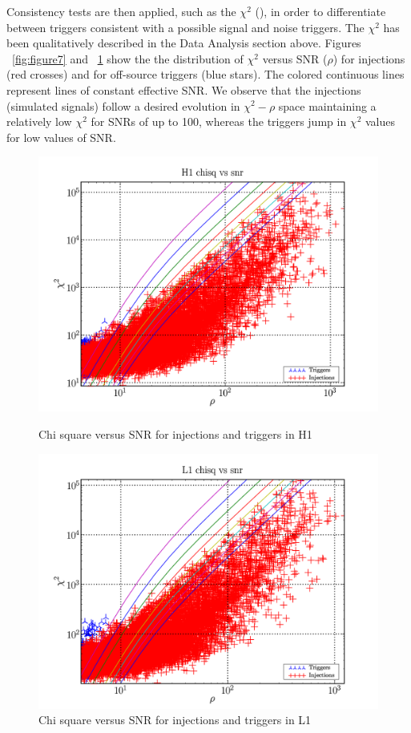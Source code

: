 \documentclass[epsf]{article}
\begin{document}
Consistency tests are then applied, such as the $\chi^2$ (\cite{grb,allen,cre}), in order to differentiate between triggers consistent with a possible signal and noise triggers. The $\chi^2$ has been qualitatively described in the Data Analysis section above. Figures ~\ref{fig:figure7} and ~\ref{fig:figure8} show the the distribution of $\chi^2$ versus SNR ($\rho$) for injections (red crosses) and for off-source triggers (blue stars). The colored continuous lines represent lines of constant effective SNR. We observe that the injections (simulated signals) follow a desired evolution in $\chi^2-\rho$ space maintaining a relatively low $\chi^2$ for SNRs of up to 100, whereas the triggers jump in $\chi^2$ values for low values of SNR.

\begin{figure}[ht]
\begin{minipage}[b]{0.5\linewidth}
\centering
\includegraphics[scale=0.15]{Chisq_H1.png}
\caption{Chi square versus SNR for injections and triggers in H1}
\label{fig:figure7}
\end{minipage}
\hspace{0.5cm}
\begin{minipage}[b]{0.5\linewidth}
\centering
\includegraphics[scale=0.15]{Chisq_L1.png}
\caption{Chi square versus SNR for injections and triggers in L1}
\label{fig:figure8}
\end{minipage}
\end{figure} 
\end{document}
